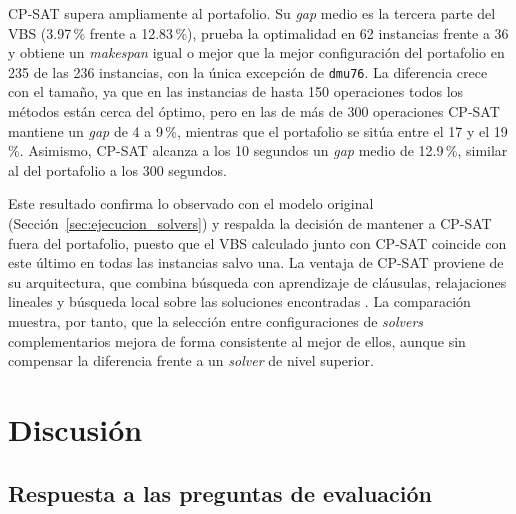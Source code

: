 

CP-SAT supera ampliamente al portafolio. Su \textit{gap} medio es la tercera
parte del VBS (3.97\,\% frente a 12.83\,\%), prueba la optimalidad en 62
instancias frente a 36 y obtiene un \textit{makespan} igual o mejor que la
mejor configuración del portafolio en 235 de las 236 instancias, con la única
excepción de \texttt{dmu76}. La diferencia crece con el tamaño, ya que en las
instancias de hasta 150 operaciones todos los métodos están cerca del óptimo,
pero en las de más de 300 operaciones CP-SAT mantiene un \textit{gap} de 4 a
9\,\%, mientras que el portafolio se sitúa entre el 17 y el 19\,\%. Asimismo,
CP-SAT alcanza a los 10 segundos un \textit{gap} medio de 12.9\,\%, similar al
del portafolio a los 300 segundos.

Este resultado confirma lo observado con el modelo original
(Sección~\ref{sec:ejecucion_solvers}) y respalda la decisión de mantener a
CP-SAT fuera del portafolio, puesto que el VBS calculado junto con CP-SAT
coincide con este último en todas las instancias salvo una. La ventaja de
CP-SAT proviene de su arquitectura, que combina búsqueda con aprendizaje de
cláusulas, relajaciones lineales y búsqueda local sobre las soluciones
encontradas \citep{perron2023}. La comparación muestra, por tanto, que la
selección entre configuraciones de \textit{solvers} complementarios mejora de
forma consistente al mejor de ellos, aunque sin compensar la diferencia frente
a un \textit{solver} de nivel superior.

\section{Discusión}
\label{sec:discusion}

\subsection{Respuesta a las preguntas de evaluación}

